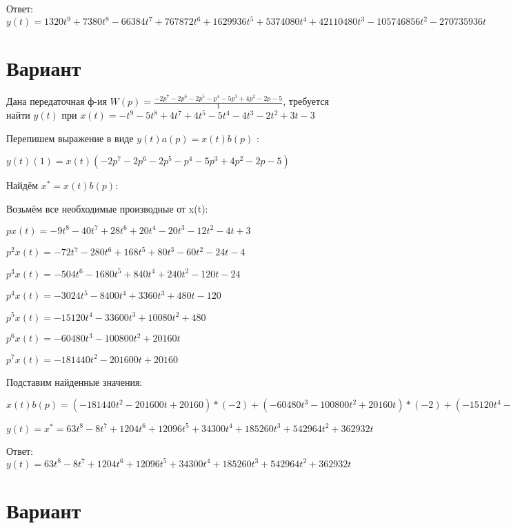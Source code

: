 \documentclass{article}
\begin{document}
{{{Ответ: $y(t) = 1320t^{9}+7380t^{8}-66384t^{7}+767872t^{6}+1629936t^{5}+5374080t^{4}+42110480t^{3}-105746856t^{2}-270735936t$

\section{Вариант}

Дана передаточная ф-ия $W(p)=\frac{-2p^{7}-2p^{6}-2p^{5}-p^{4}-5p^{3}+4p^{2}-2p-5}{1}$, требуется найти $y(t)$ при $x(t)=-t^{9}-5t^{8}+4t^{7}+4t^{5}-5t^{4}-4t^{3}-2t^{2}+3t-3$

Перепишем выражение в виде $y(t)a(p)=x(t)b(p)$ :

$y(t)(1)=x(t)(-2p^{7}-2p^{6}-2p^{5}-p^{4}-5p^{3}+4p^{2}-2p-5)$

Найдём $x^*=x(t)b(p)$:

Возьмём все необходимые производные от x(t):

$px(t)=-9t^{8}-40t^{7}+28t^{6}+20t^{4}-20t^{3}-12t^{2}-4t+3$

$p^2x(t)=-72t^{7}-280t^{6}+168t^{5}+80t^{3}-60t^{2}-24t-4$

$p^3x(t)=-504t^{6}-1680t^{5}+840t^{4}+240t^{2}-120t-24$

$p^4x(t)=-3024t^{5}-8400t^{4}+3360t^{3}+480t-120$

$p^5x(t)=-15120t^{4}-33600t^{3}+10080t^{2}+480$

$p^6x(t)=-60480t^{3}-100800t^{2}+20160t$

$p^7x(t)=-181440t^{2}-201600t+20160$

Подставим найденные значения:

$x(t)b(p) = (-181440t^{2}-201600t+20160)*(-2)+(-60480t^{3}-100800t^{2}+20160t)*(-2)+(-15120t^{4}-33600t^{3}+10080t^{2}+480)*(-2)+(-3024t^{5}-8400t^{4}+3360t^{3}+480t-120)*(-1)+(-504t^{6}-1680t^{5}+840t^{4}+240t^{2}-120t-24)*(-5)+(-72t^{7}-280t^{6}+168t^{5}+80t^{3}-60t^{2}-24t-4)*4+(-9t^{8}-40t^{7}+28t^{6}+20t^{4}-20t^{3}-12t^{2}-4t+3)*(-2)+(-9t^{8}-40t^{7}+28t^{6}+20t^{4}-20t^{3}-12t^{2}-4t+3)*(-5)=63t^{8}-8t^{7}+1204t^{6}+12096t^{5}+34300t^{4}+185260t^{3}+542964t^{2}+362932t$





$y(t)=x^*=63t^{8}-8t^{7}+1204t^{6}+12096t^{5}+34300t^{4}+185260t^{3}+542964t^{2}+362932t$

Ответ: $y(t) = 63t^{8}-8t^{7}+1204t^{6}+12096t^{5}+34300t^{4}+185260t^{3}+542964t^{2}+362932t$

\section{Вариант}

}}}
\end{document}
